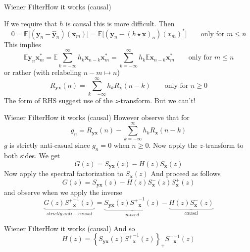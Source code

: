 \documentclass{beamer}  %
\newcommand{\E}{\mathbb{E}}
\begin{document}

\begin{frame}{Wiener Filter}{How it works (causal)}
	
	If we require that $h$ is causal this is more difficult.  
	Then
	$$ 0 = \E\big[(\textbf{y}_n - \hat{\textbf{y}}_n)(\textbf{x}_m)\big] = \E\big[(\textbf{y}_n - (h \star \textbf{x})_n)(x_m)^*\big]\qquad \text{only for }m\le n$$
	This implies 
	$$\E \textbf{y}_n\textbf{x}_m^* = \E \sum_{k=-\infty}^\infty h_{k}\textbf{x}_{n-k} \textbf{x}^*_m = \sum_{k=-\infty}^\infty h_{k} \E \textbf{x}_{n-k} \textbf{x}^*_m \qquad \text{only for }m\le n$$
	or rather (with relabeling $n-m \mapsto n$)
	$$R_{\textbf{yx}}(n) = \sum_{k=-\infty}^\infty h_{k} R_{\textbf{x}}(n-k) \qquad \text{only for } n \ge 0$$
	The form of RHS suggest use of the $z$-transform. But we can't!
\end{frame}


\begin{frame}{Wiener Filter}{How it works (causal)}
	However observe that for 
	$$g_n = R_{\textbf{yx}}(n) - \sum_{k=-\infty}^\infty h_{k} R_{\textbf{x}}(n-k)$$
	$g$ is strictly anti-casual since $g_n = 0$ when $n \ge 0$. Now apply the $z$-transform to both sides. We get
	$$G(z) = S_{\textbf{yx}}(z) - H(z) S_{\textbf{x}}(z)$$
	Now apply the spectral factorization to $S_{\textbf{x}}(z)$
	And proceed as follows
	$$G(z) = S_{\textbf{yx}}(z) - H(z) S^-_{\textbf{x}}(z)S^+_{\textbf{x}}(z)$$
	and observe when we apply the inverse
	$$\underbrace{G(z){S^+}^{-1}_{\textbf{x}}(z)}_{strictly\; anti-causal} = \underbrace{S_{\textbf{yx}}(z){S^+}^{-1}_{\textbf{x}}(z)}_{mixed} - \underbrace{H(z) S^-_{\textbf{x}}(z)}_{causal}$$ 
\end{frame}

\begin{frame}{Wiener Filter}{How it works (causal)}
	And so 
	$$H(z) = \left\{S_{\textbf{yx}}(z){S^+}^{-1}_{\textbf{x}}(z)\right\}_+ {S^-}^{-1}_{\textbf{x}}(z)$$
\end{frame}

\end{document}
